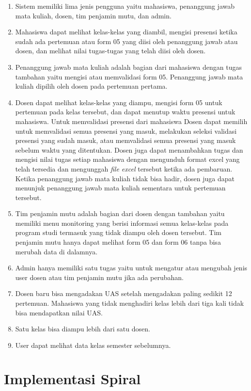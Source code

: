 \begin{enumerate}
	\item Sistem memiliki lima jenis pengguna yaitu mahasiswa, penanggung jawab mata kuliah, dosen, tim penjamin mutu, dan admin.
	\item Mahasiswa dapat melihat kelas-kelas yang diambil, mengisi presensi ketika sudah ada pertemuan atau form 05 yang diisi oleh penanggung jawab atau dosen, dan melihat nilai tugas-tugas yang telah diisi oleh dosen.
	\item Penanggung jawab mata kuliah adalah bagian dari mahasiswa dengan tugas tambahan yaitu  mengisi atau memvalidasi form 05. Penanggung jawab mata kuliah dipilih oleh dosen pada pertemuan pertama.
	\item Dosen dapat melihat kelas-kelas yang diampu, mengisi form 05 untuk pertemuan pada kelas tersebut, dan dapat menutup waktu presensi untuk mahasiswa. Untuk memvalidasi presensi dari mahasiswa Dosen dapat memilih untuk memvalidasi semua presensi yang masuk, melakukan seleksi validasi presensi yang sudah masuk, atau memvalidasi semua presensi yang masuk sebelum waktu yang ditentukan.  Dosen juga dapat menambahkan tugas dan mengisi nilai tugas setiap mahasiswa dengan mengunduh format excel yang telah tersedia dan mengunggah \textit{file excel} tersebut ketika ada pembaruan. Ketika penanggung jawab mata kuliah tidak bisa hadir, dosen juga dapat menunjuk penanggung jawab mata kuliah sementara untuk pertemuan tersebut.
	\item Tim penjamin mutu adalah bagian dari dosen dengan tambahan yaitu memiliki menu monitoring yang berisi informasi semua kelas-kelas pada program studi termasuk yang tidak diampu oleh dosen tersebut. Tim penjamin mutu hanya dapat melihat form 05 dan form 06 tanpa bisa merubah data di dalamnya.
	\item Admin hanya memiliki satu tugas yaitu untuk mengatur atau mengubah jenis user dosen atau tim penjamin mutu jika ada perubahan.
	\item Dosen baru bisa mengadakan UAS setelah mengadakan paling sedikit 12 pertemuan. Mahasiswa yang tidak menghadiri kelas lebih dari tiga kali tidak bisa mendapatkan nilai UAS.
	\item Satu kelas bisa diampu lebih dari satu dosen.
	\item User dapat melihat data kelas semester sebelumnya.
	
\end{enumerate}


\section{Implementasi Spiral}


